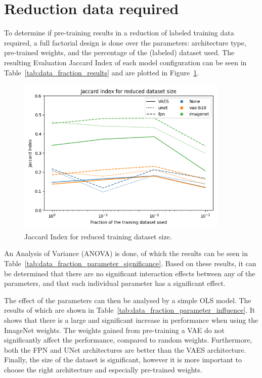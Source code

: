 \section{Reduction data required}
To determine if pre-training results in a reduction of labeled training data required, a full factorial design is done over the parameters: architecture type, pre-trained weights, and the percentage of the (labeled) dataset used. The resulting Evaluation Jaccard Index of each model configuration can be seen in Table~\ref{tab:data_fraction_results} and are plotted in Figure~\ref{fig:dataset-fraction-results}.


\begin{figure}[h]
    \centering
    \includegraphics[width=0.9\textwidth]{figures/data_percentage/line-plot.png}
    \caption{Jaccard Index for reduced training dataset size.}
    \label{fig:dataset-fraction-results}
\end{figure}

An Analysis of Variance (ANOVA) is done, of which the results can be seen in Table~\ref{tab:data_fraction_parameter_significance}. Based on these results, it can be determined that there are no significant interaction effects between any of the parameters, and that each individual parameter has a significant effect.


The effect of the parameters can then be analysed by a simple OLS model. The results of which are shown in Table~\ref{tab:data_fraction_parameter_influence}. It shows that there is a large and significant increase in performance when using the ImageNet weights. The weights gained from pre-training a VAE do not significantly affect the performance, compared to random weights. Furthermore, both the FPN and UNet architectures are better than the VAES architecture. Finally, the size of the dataset is significant, however it is more important to choose the right architecture and especially pre-trained weights.


